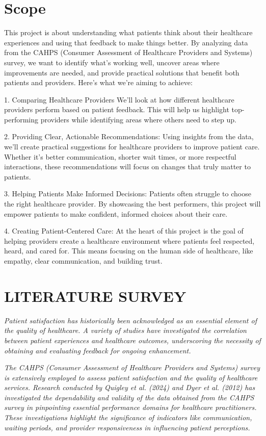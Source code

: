 \section{Scope}
\IEEEPARstart This project is about understanding what patients think about their healthcare experiences and using that feedback to make things better. By analyzing data from the CAHPS (Consumer Assessment of Healthcare Providers and Systems) survey, we want to identify what’s working well, uncover areas where improvements are needed, and provide practical solutions that benefit both patients and providers. Here’s what we’re aiming to achieve:

1. Comparing Healthcare Providers
We’ll look at how different healthcare providers perform based on patient feedback. This will help us highlight top-performing providers while identifying areas where others need to step up.

2. Providing Clear, Actionable Recommendations: 
Using insights from the data, we’ll create practical suggestions for healthcare providers to improve patient care. Whether it’s better communication, shorter wait times, or more respectful interactions, these recommendations will focus on changes that truly matter to patients.

3. Helping Patients Make Informed Decisions:
Patients often struggle to choose the right healthcare provider. By showcasing the best performers, this project will empower patients to make confident, informed choices about their care.

4. Creating Patient-Centered Care: 
At the heart of this project is the goal of helping providers create a healthcare environment where patients feel respected, heard, and cared for. This means focusing on the human side of healthcare, like empathy, clear communication, and building trust.

\section{LITERATURE SURVEY}

\textit{Patient satisfaction has historically been acknowledged as an essential element of the quality of healthcare. A variety of studies have investigated the correlation between patient experiences and healthcare outcomes, underscoring the necessity of obtaining and evaluating feedback for ongoing enhancement.}

\textit{The CAHPS (Consumer Assessment of Healthcare Providers and Systems) survey is extensively employed to assess patient satisfaction and the quality of healthcare services. Research conducted by Quigley et al. (2024) and Dyer et al. (2012) has investigated the dependability and validity of the data obtained from the CAHPS survey in pinpointing essential performance domains for healthcare practitioners. These investigations highlight the significance of indicators like communication, waiting periods, and provider responsiveness in influencing patient perceptions.}

